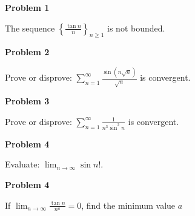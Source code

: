 \documentclass{article}
\begin{document}
\begin{center}
    \textbf{Problem 1}
\end{center}
\begin{problem}{}
    The sequence $\displaystyle \left\{ \frac{\tan n}{n} \right\}_{n \geq 1}$ is not bounded. 
\end{problem}

\vspace{.5cm}
\begin{center}
    \textbf{Problem 2}
\end{center}
\begin{problem}{}
    Prove or disprove: $\displaystyle \sum_{n = 1}^\infty \frac{\sin (n \sqrt{n})}{\sqrt{n}}$ is convergent. 
\end{problem}

\vspace{.5cm}
\begin{center}
    \textbf{Problem 3}
\end{center}
\begin{problem}{}
    Prove or disprove: $\displaystyle \sum_{n = 1}^\infty \frac{1}{n^3 \sin^2 n}$ is convergent. 
\end{problem}

\vspace{.5cm}
\begin{center}
    \textbf{Problem 4}
\end{center}
\begin{problem}{}
    Evaluate: $\displaystyle \lim_{n \to \infty} \sin n!$. 
\end{problem}

\vspace{.5cm}
\begin{center}
    \textbf{Problem 4}
\end{center}
\begin{problem}{}
    If $\displaystyle \lim_{n \to \infty} \frac{\tan n}{n^a} = 0$, find the minimum value $a$
\end{problem}
\end{document}
